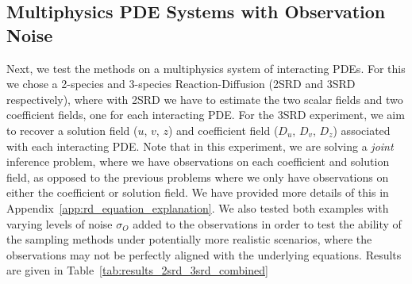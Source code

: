 \subsection{Multiphysics PDE Systems with Observation Noise}
Next, we test the methods on a multiphysics system of interacting PDEs. For this we chose a 2-species and 3-species Reaction-Diffusion \citep{doi:10.1126/science.1179047, b7a37744d27f4959bce204655593c290} (2SRD and 3SRD respectively), where with 2SRD we have to estimate the two scalar fields and two coefficient fields, one for each interacting PDE. For the 3SRD experiment, we aim to recover a solution field ($u$, $v$, $z$) and coefficient field ($D_u$, $D_v$, $D_z$) associated with each interacting PDE. Note that in this experiment, we are solving a \emph{joint} inference problem, where we have observations on each coefficient and solution field, as opposed to the previous problems where we only have observations on either the coefficient or solution field. We have provided more details of this in Appendix~\ref{app:rd_equation_explanation}. We also tested both examples with varying levels of noise $\sigma_O$ added to the observations in order to test the ability of the sampling methods under potentially more realistic scenarios, where the observations may not be perfectly aligned with the underlying equations. Results are given in Table~\ref{tab:results_2srd_3srd_combined}

